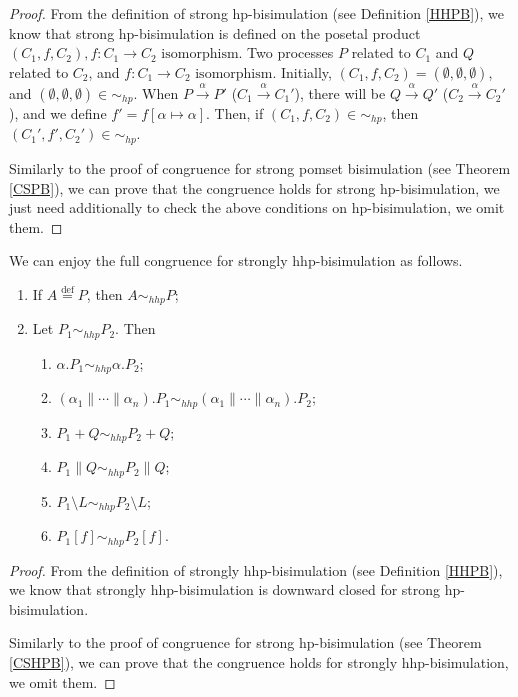 \begin{proof}
From the definition of strong hp-bisimulation (see Definition \ref{HHPB}), we know that strong hp-bisimulation is defined on the posetal product $(C_1,f,C_2),f:C_1\rightarrow C_2\textrm{ isomorphism}$. Two processes $P$ related to $C_1$ and $Q$ related to $C_2$, and $f:C_1\rightarrow C_2\textrm{ isomorphism}$. Initially, $(C_1,f,C_2)=(\emptyset,\emptyset,\emptyset)$, and $(\emptyset,\emptyset,\emptyset)\in\sim_{hp}$. When $P\xrightarrow{\alpha}P'$ ($C_1\xrightarrow{\alpha}C_1'$), there will be $Q\xrightarrow{\alpha}Q'$ ($C_2\xrightarrow{\alpha}C_2'$), and we define $f'=f[\alpha\mapsto \alpha]$. Then, if $(C_1,f,C_2)\in\sim_{hp}$, then $(C_1',f',C_2')\in\sim_{hp}$.

Similarly to the proof of congruence for strong pomset bisimulation (see Theorem \ref{CSPB}), we can prove that the congruence holds for strong hp-bisimulation, we just need additionally to check the above conditions on hp-bisimulation, we omit them.
\end{proof}

\begin{theorem} \label{CSHHPB}
We can enjoy the full congruence for strongly hhp-bisimulation as follows.
\begin{enumerate}
  \item If $A\overset{\text{def}}{=}P$, then $A\sim_{hhp} P$;
  \item Let $P_1\sim_{hhp} P_2$. Then
        \begin{enumerate}
           \item $\alpha.P_1\sim_{hhp} \alpha.P_2$;
           \item $(\alpha_1\parallel\cdots\parallel\alpha_n).P_1\sim_{hhp} (\alpha_1\parallel\cdots\parallel\alpha_n).P_2$;
           \item $P_1+Q\sim_{hhp} P_2 +Q$;
           \item $P_1\parallel Q\sim_{hhp} P_2\parallel Q$;
           \item $P_1\setminus L\sim_{hhp} P_2\setminus L$;
           \item $P_1[f]\sim_{hhp} P_2[f]$.
         \end{enumerate}
\end{enumerate}
\end{theorem}

\begin{proof}
From the definition of strongly hhp-bisimulation (see Definition \ref{HHPB}), we know that strongly hhp-bisimulation is downward closed for strong hp-bisimulation.

Similarly to the proof of congruence for strong hp-bisimulation (see Theorem \ref{CSHPB}), we can prove that the congruence holds for strongly hhp-bisimulation, we omit them.
\end{proof}

